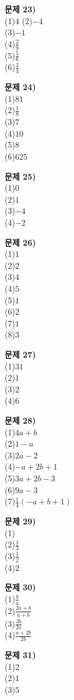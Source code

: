 \documentclass{oblivoir}
\newcommand\an[1]{\par\bigskip\noindent\textbf{문제 #1)}\\}
\begin{document}
\clearpage
\begin{minipage}{0.33\textwidth}

%
\an{23}
\noindent
(1)\:\:\(4\)
(2)\:\:\(-4\)\\
(3)\:\:\(-1\)\\
(4)\:\:\(\frac29\)\\
(5)\:\:\(\frac56\)\\
(6)\:\:\(\frac34\)

%
\an{24}
\noindent
(1)\:\:\(81\)\\
(2)\:\:\(\frac18\)\\
(3)\:\:\(7\)\\
(4)\:\:\(10\)\\
(5)\:\:\(8\)\\
(6)\:\:\(625\)

%
\an{25}
\noindent
(1)\:\:\(0\)\\
(2)\:\:\(1\)\\
(3)\:\:\(-4\)\\
(4)\:\:\(-2\)

%
\an{26}
\noindent
(1)\:\:\(1\)\\
(2)\:\:\(2\)\\
(3)\:\:\(4\)\\
(4)\:\:\(5\)\\
(5)\:\:\(1\)\\
(6)\:\:\(2\)\\
(7)\:\:\(1\)\\
(8)\:\:\(3\)
\end{minipage}
\begin{minipage}{0.33\textwidth}

%
\an{27}
\noindent
(1)\:\:\(31\)\\
(2)\:\:\(1\)\\
(3)\:\:\(2\)\\
(4)\:\:\(6\)

%
\an{28}
\noindent
(1)\:\:\(4a+b\)\\
(2)\:\:\(1-a\)\\
(3)\:\:\(2a-2\)\\
(4)\:\:\(-a+2b+1\)\\
(5)\:\:\(3a+2b-3\)\\
(6)\:\:\(9a-3\)\\
(7)\:\:\(\frac14(-a+b+1)\)

%
\an{29}
\noindent
(1)\:\\
(2)\:\:\(\frac13\)\\
(3)\:\:\(\frac12\)\\
(4)\:\:\(2\)

%
\an{30}
\noindent
(1)\:\:\(\frac ba\)\\
(2)\:\:\(\frac{2a+b}{a+b}\)\\
(3)\:\:\(\frac{3b}{2a}\)\\
(4)\:\:\(\frac{a+2b}{2b}\)

%
\an{31}
\noindent
(1)\:\:\(2\)\\
(2)\:\:\(1\)\\
(3)\:\:\(5\)
\end{minipage}
\end{document}
